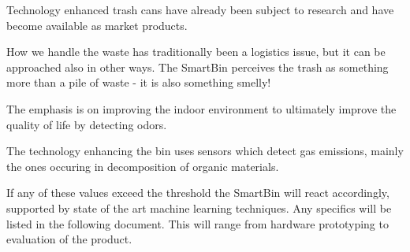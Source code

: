 Technology enhanced trash cans have already been subject to research and have become available as market products.

How we handle the waste has traditionally been a logistics issue, but it can be approached also in other ways. The SmartBin perceives the trash as something more than a pile of waste - it is also something smelly!

The emphasis is on improving the indoor environment to ultimately improve the quality of life by detecting odors.

The technology enhancing the bin uses sensors which detect gas emissions, mainly the ones occuring in decomposition of organic materials.

If any of these values exceed the threshold the SmartBin will react accordingly, supported by state of the art machine learning techniques.
Any specifics will be listed in the following document. This will range from hardware prototyping to evaluation of the product.